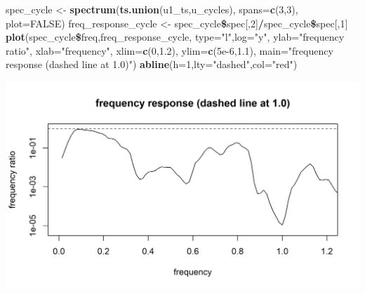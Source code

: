 \documentclass[]{article}
\newenvironment{Shaded}{\begin{snugshade}}{\end{snugshade}}
\newcommand{\KeywordTok}[1]{\textcolor[rgb]{0.13,0.29,0.53}{\textbf{#1}}}
\newcommand{\DataTypeTok}[1]{\textcolor[rgb]{0.13,0.29,0.53}{#1}}
\newcommand{\DecValTok}[1]{\textcolor[rgb]{0.00,0.00,0.81}{#1}}
\newcommand{\FloatTok}[1]{\textcolor[rgb]{0.00,0.00,0.81}{#1}}
\newcommand{\StringTok}[1]{\textcolor[rgb]{0.31,0.60,0.02}{#1}}
\newcommand{\OtherTok}[1]{\textcolor[rgb]{0.56,0.35,0.01}{#1}}
\newcommand{\OperatorTok}[1]{\textcolor[rgb]{0.81,0.36,0.00}{\textbf{#1}}}
\newcommand{\NormalTok}[1]{#1}
\begin{document}
\begin{Shaded}
\begin{Highlighting}[]
\NormalTok{spec_cycle <-}\StringTok{ }\KeywordTok{spectrum}\NormalTok{(}\KeywordTok{ts.union}\NormalTok{(u1_ts,u_cycles),}
  \DataTypeTok{spans=}\KeywordTok{c}\NormalTok{(}\DecValTok{3}\NormalTok{,}\DecValTok{3}\NormalTok{),}
  \DataTypeTok{plot=}\OtherTok{FALSE}\NormalTok{)}
\NormalTok{freq_response_cycle <-}\StringTok{ }\NormalTok{spec_cycle}\OperatorTok{\$}\NormalTok{spec[,}\DecValTok{2}\NormalTok{]}\OperatorTok{/}\NormalTok{spec_cycle}\OperatorTok{\$}\NormalTok{spec[,}\DecValTok{1}\NormalTok{]}
\KeywordTok{plot}\NormalTok{(spec_cycle}\OperatorTok{\$}\NormalTok{freq,freq_response_cycle,}
  \DataTypeTok{type=}\StringTok{"l"}\NormalTok{,}\DataTypeTok{log=}\StringTok{"y"}\NormalTok{,}
  \DataTypeTok{ylab=}\StringTok{"frequency ratio"}\NormalTok{, }\DataTypeTok{xlab=}\StringTok{"frequency"}\NormalTok{, }\DataTypeTok{xlim=}\KeywordTok{c}\NormalTok{(}\DecValTok{0}\NormalTok{,}\FloatTok{1.2}\NormalTok{), }\DataTypeTok{ylim=}\KeywordTok{c}\NormalTok{(}\FloatTok{5e-6}\NormalTok{,}\FloatTok{1.1}\NormalTok{),}
  \DataTypeTok{main=}\StringTok{"frequency response (dashed line at 1.0)"}\NormalTok{)}
\KeywordTok{abline}\NormalTok{(}\DataTypeTok{h=}\DecValTok{1}\NormalTok{,}\DataTypeTok{lty=}\StringTok{"dashed"}\NormalTok{,}\DataTypeTok{col=}\StringTok{"red"}\NormalTok{)  }
\end{Highlighting}
\end{Shaded}

\begin{center}\includegraphics{figure/intro-freq_response-1} \end{center}

\end{document}
